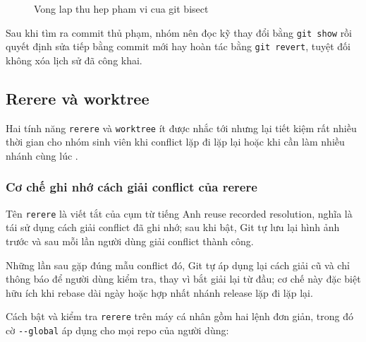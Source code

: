 \begin{figure}[H]
\centering
{}
\caption{Vong lap thu hep pham vi cua git bisect}
\label{fig:c32-bisect}
\end{figure}

Sau khi tìm ra commit thủ phạm, nhóm nên đọc kỹ thay đổi bằng \verb|git show| rồi quyết định sửa tiếp bằng commit mới hay hoàn tác bằng \verb|git revert|, tuyệt đối không xóa lịch sử đã công khai.

\subsection{Rerere và worktree}
\label{sec:c32-rerere-worktree}

Hai tính năng \verb|rerere| và \verb|worktree| ít được nhắc tới nhưng lại tiết kiệm rất nhiều thời gian cho nhóm sinh viên khi conflict lặp đi lặp lại hoặc khi cần làm nhiều nhánh cùng lúc \cite{progit}.

\subsubsection{Cơ chế ghi nhớ cách giải conflict của rerere}

Tên \verb|rerere| là viết tắt của cụm từ tiếng Anh reuse recorded resolution, nghĩa là tái sử dụng cách giải conflict đã ghi nhớ; sau khi bật, Git tự lưu lại hình ảnh trước và sau mỗi lần người dùng giải conflict thành công.

Những lần sau gặp đúng mẫu conflict đó, Git tự áp dụng lại cách giải cũ và chỉ thông báo để người dùng kiểm tra, thay vì bắt giải lại từ đầu; cơ chế này đặc biệt hữu ích khi rebase dài ngày hoặc hợp nhất nhánh release lặp đi lặp lại.

Cách bật và kiểm tra \verb|rerere| trên máy cá nhân gồm hai lệnh đơn giản, trong đó cờ \verb|--global| áp dụng cho mọi repo của người dùng:

